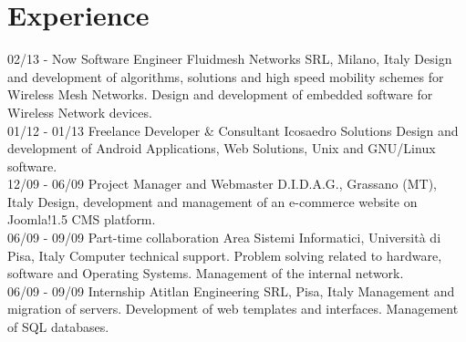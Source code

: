 \documentclass[]{friggeri-cv}
\begin{document}
\section{Experience}
\begin{entrylist}
  \entry
    {02/13 - Now}
    {Software Engineer}
    {Fluidmesh Networks SRL, Milano, Italy}
    {Design and development of algorithms, solutions and high speed mobility           schemes for Wireless Mesh Networks. Design and development of embedded software     for Wireless Network devices.\\}
  \entry
    {01/12 - 01/13}
    {Freelance Developer \& Consultant}
    {Icosaedro Solutions}
    {Design and development of Android Applications, Web Solutions, Unix and GNU/Linux software.\\}
    \entry
    {12/09 - 06/09}
    {Project Manager and Webmaster}
    {D.I.D.A.G., Grassano (MT), Italy}
    {Design, development and management of an e-commerce website on Joomla!1.5 CMS platform.\\}
    \entry
    {06/09 - 09/09}
    {Part-time collaboration}
    {Area Sistemi Informatici, Università di Pisa, Italy}
    {Computer technical support. Problem solving related to hardware, software and Operating Systems. Management of the internal network.\\}
    \entry
    {06/09 - 09/09}
    {Internship}
    {Atitlan Engineering SRL, Pisa, Italy}
    {Management and migration of servers. Development of web templates and interfaces. Management of SQL databases.}
\end{entrylist}
\end{document}
